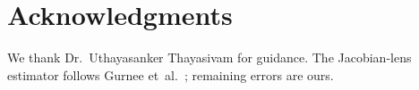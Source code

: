 \documentclass[conference]{IEEEtran}
\begin{document}
\section*{Acknowledgments}

We thank Dr.~Uthayasanker Thayasivam for guidance. The Jacobian-lens estimator follows Gurnee et~al.~\cite{gurnee2026workspace}; remaining errors are ours.

\balance


\end{document}
